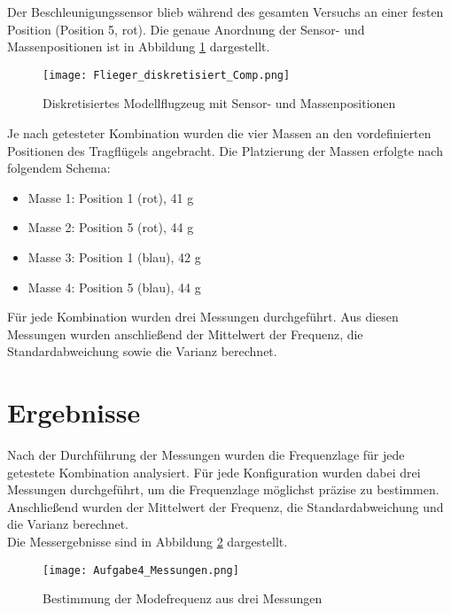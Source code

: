     \noindent
    Der Beschleunigungssensor blieb während des gesamten Versuchs an einer festen Position 
    (Position 5, rot). Die genaue Anordnung der Sensor- und Massenpositionen ist in 
    Abbildung \ref{fig: Flieger_diskretisiert_2} dargestellt.

    \begin{figure}[H]
        \centering
        \texttt{[image: Flieger\_diskretisiert\_Comp.png]}
        \caption{Diskretisiertes Modellflugzeug mit Sensor- und Massenpositionen}
        \label{fig: Flieger_diskretisiert_2}
    \end{figure}

    \noindent
    Je nach getesteter Kombination wurden die vier Massen an den vordefinierten Positionen 
    des Tragflügels angebracht. Die Platzierung der Massen erfolgte nach folgendem Schema:

    \begin{itemize}
        \item Masse 1: Position 1 (rot), 41 g  
        \item Masse 2: Position 5 (rot), 44 g  
        \item Masse 3: Position 1 (blau), 42 g  
        \item Masse 4: Position 5 (blau), 44 g  
    \end{itemize}

    \noindent
    Für jede Kombination wurden drei Messungen durchgeführt. Aus diesen Messungen wurden 
    anschließend der Mittelwert der Frequenz, die Standardabweichung sowie die Varianz berechnet.
\section{Ergebnisse}
    Nach der Durchführung der Messungen wurden die Frequenzlage für jede getestete 
    Kombination analysiert. Für jede Konfiguration wurden dabei drei Messungen durchgeführt, 
    um die Frequenzlage möglichst präzise zu bestimmen. Anschließend wurden der Mittelwert der 
    Frequenz, die Standardabweichung und die Varianz berechnet.  
    \\

    \noindent
    Die Messergebnisse sind in Abbildung \ref{fig: Aufgabe4_Messungen} dargestellt.
    
    \begin{figure}[H]
        \centering
        \texttt{[image: Aufgabe4\_Messungen.png]}
        \caption{Bestimmung der Modefrequenz aus drei Messungen}
        \label{fig: Aufgabe4_Messungen}
    \end{figure}
    
